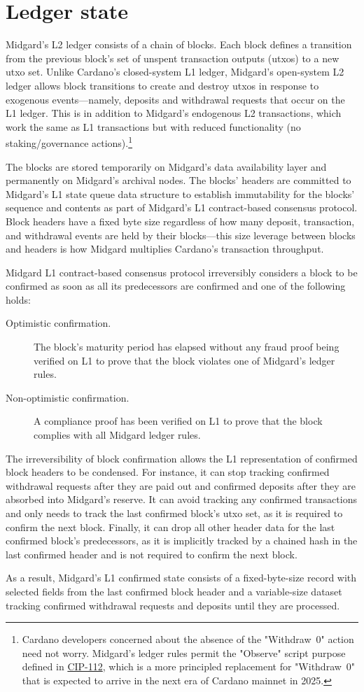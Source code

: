 \documentclass[../midgard.tex]{subfiles}
\begin{document}
\chapter{Ledger state}
\label{h:ledger-state}

Midgard's L2 ledger consists of a chain of blocks. Each block defines a transition from the previous block's set of unspent transaction outputs (utxos) to a new utxo set. Unlike Cardano's closed-system L1 ledger, Midgard's open-system L2 ledger allows block transitions to create and destroy utxos in response to exogenous events---namely, deposits and withdrawal requests that occur on the L1 ledger. This is in addition to Midgard's endogenous L2 transactions, which work the same as L1 transactions but with reduced functionality (no staking/governance actions).\footnote{Cardano developers concerned about the absence of the "Withdraw~0" action need not worry. Midgard's ledger rules permit the "Observe" script purpose defined in \href{https://github.com/cardano-foundation/CIPs/tree/master/CIP-0112}{CIP-112}, which is a more principled replacement for "Withdraw~0" that is expected to arrive in the next era of Cardano mainnet in 2025.}

The blocks are stored temporarily on Midgard's data availability layer and permanently on Midgard's archival nodes. The blocks' headers are committed to Midgard's L1 state queue data structure to establish immutability for the blocks' sequence and contents as part of Midgard's L1 contract-based consensus protocol. Block headers have a fixed byte size regardless of how many deposit, transaction, and withdrawal events are held by their blocks---this size leverage between blocks and headers is how Midgard multiplies Cardano's transaction throughput.

Midgard L1 contract-based consensus protocol irreversibly considers a block to be confirmed as soon as all its predecessors are confirmed and one of the following holds:
\begin{description}
    \item[Optimistic confirmation.] The block's maturity period has elapsed without any fraud proof being verified on L1 to prove that the block violates one of Midgard's ledger rules.
    \item[Non-optimistic confirmation.] A compliance proof has been verified on L1 to prove that the block complies with all Midgard ledger rules.
\end{description}

The irreversibility of block confirmation allows the L1 representation of confirmed block headers to be condensed. For instance, it can stop tracking confirmed withdrawal requests after they are paid out and confirmed deposits after they are absorbed into Midgard's reserve. It can avoid tracking any confirmed transactions and only needs to track the last confirmed block's utxo set, as it is required to confirm the next block. Finally, it can drop all other header data for the last confirmed block's predecessors, as it is implicitly tracked by a chained hash in the last confirmed header and is not required to confirm the next block.

As a result, Midgard's L1 confirmed state consists of a fixed-byte-size record with selected fields from the last confirmed block header and a variable-size dataset tracking confirmed withdrawal requests and deposits until they are processed.
\end{document}
